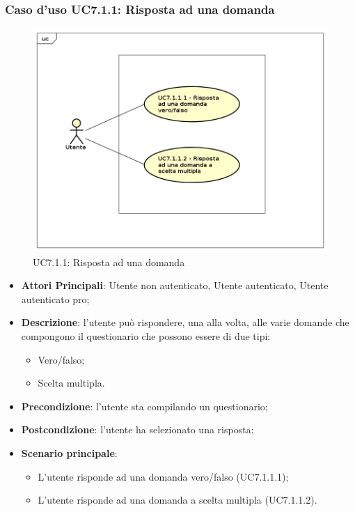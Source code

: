 \subsubsection{Caso d'uso UC7.1.1: Risposta ad una domanda}
\label{UC7.1.1}
\begin{figure}[h]
\centering
\includegraphics[scale=0.5,keepaspectratio]{UML/UC7_1_1.png}
\caption{UC7.1.1: Risposta ad una domanda}
\end{figure}
\FloatBarrier
\begin{itemize}
\item\textbf{Attori Principali}: Utente non autenticato, Utente autenticato, Utente autenticato pro;
\item\textbf{Descrizione}: l'utente può rispondere, una alla volta, alle varie domande che compongono il questionario che possono essere di due tipi:
\begin{itemize}
\item Vero/falso;
\item Scelta multipla.
\end{itemize}
\item\textbf{Precondizione}: l'utente sta compilando un questionario;
\item\textbf{Postcondizione}: l'utente ha selezionato una risposta;
\item\textbf{Scenario principale}: 
\begin{itemize}
\item L'utente risponde ad una domanda vero/falso (UC7.1.1.1);
\item L'utente risponde ad una domanda a scelta multipla (UC7.1.1.2).
\end{itemize}
\end{itemize}

